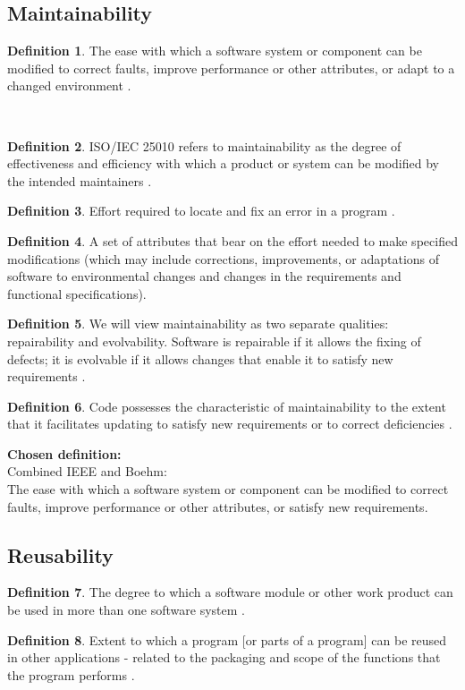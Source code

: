 \documentclass[letterpaper,cleveref]{lipics-v2019}
\theoremstyle{definition}
\newtheorem{defn}{Definition}
\begin{document}
\subsection{Maintainability}
\begin{defn}
The ease with which a software system or component can be modified to correct faults, improve performance or other attributes, or adapt to a changed environment \cite{IEEEStdGlossarySET1990}. 
\end{defn}\
\begin{defn}
ISO/IEC 25010 refers to maintainability as the degree of effectiveness and efficiency with which a product or system can be modified by the intended maintainers \cite{ISO/IEC25010}.
\end{defn}
\begin{defn}
Effort required to locate and fix an error in a program
\cite{pressman2005software}.\\
\end{defn}
\begin{defn}
A set of attributes that bear on the effort needed to make specified modifications (which may include corrections, improvements, or adaptations of software to environmental changes and changes in the requirements and functional specifications)\cite{pfleeger2006software}.
\end{defn}
\begin{defn}
We will view maintainability as two separate qualities: repairability and evolvability. Software is repairable if it allows the fixing of defects; it is evolvable if it allows changes that enable it to satisfy new requirements \cite{ghezzi1991fundamentals}.
\end{defn}
\begin{defn}
Code possesses the characteristic of maintainability to the extent that it facilitates updating to satisfy new requirements or to correct deficiencies \cite{boehm2007software}.
\end{defn}

\textbf{Chosen definition:}\\
Combined IEEE and Boehm:\\
The ease with which a software system or component can be modified to correct faults, improve performance or other attributes, or satisfy new requirements.\\



\subsection{Reusability}
\begin{defn}
The degree to which a software module or other work product can be used in more than one software system \cite{IEEEStdGlossarySET1990}. \\
\end{defn}
\begin{defn}
Extent to which a program [or parts of a program] can be reused in other applications - related to the packaging and scope of the functions that the program performs \cite{pressman2005software}.\\
\end{defn}
\end{document}
